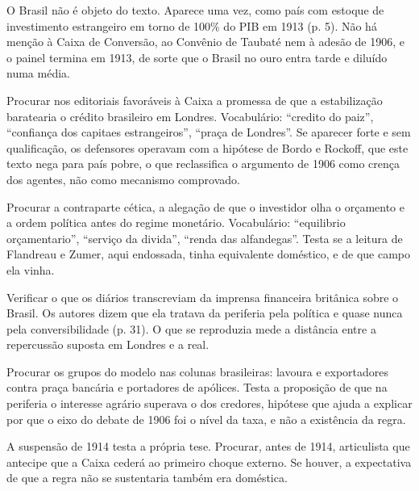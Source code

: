 O Brasil não é objeto do texto. Aparece uma vez, como país com estoque de
investimento estrangeiro em torno de 100\% do PIB em 1913 (p. 5). Não há menção à
Caixa de Conversão, ao Convênio de Taubaté nem à adesão de 1906, e o painel
termina em 1913, de sorte que o Brasil no ouro entra tarde e diluído numa média.


\begin{dialogo}
\item Procurar nos editoriais favoráveis à Caixa a promessa de que a estabilização
baratearia o crédito brasileiro em Londres. Vocabulário: ``credito do paiz'',
``confiança dos capitaes estrangeiros'', ``praça de Londres''. Se aparecer forte e
sem qualificação, os defensores operavam com a hipótese de Bordo e Rockoff, que
este texto nega para país pobre, o que reclassifica o argumento de 1906 como
crença dos agentes, não como mecanismo comprovado.
\item Procurar a contraparte cética, a alegação de que o investidor olha o
orçamento e a ordem política antes do regime monetário. Vocabulário:
``equilibrio orçamentario'', ``serviço da divida'', ``renda das alfandegas''.
Testa se a leitura de Flandreau e Zumer, aqui endossada, tinha equivalente
doméstico, e de que campo ela vinha.
\item Verificar o que os diários transcreviam da imprensa financeira britânica
sobre o Brasil. Os autores dizem que ela tratava da periferia pela política e
quase nunca pela conversibilidade (p. 31). O que se reproduzia mede a distância
entre a repercussão suposta em Londres e a real.
\item Procurar os grupos do modelo nas colunas brasileiras: lavoura e exportadores
contra praça bancária e portadores de apólices. Testa a proposição de que na
periferia o interesse agrário superava o dos credores, hipótese que ajuda a
explicar por que o eixo do debate de 1906 foi o nível da taxa, e não a existência
da regra.
\item A suspensão de 1914 testa a própria tese. Procurar, antes de 1914,
articulista que antecipe que a Caixa cederá ao primeiro choque externo. Se
houver, a expectativa de que a regra não se sustentaria também era doméstica.
\end{dialogo}

